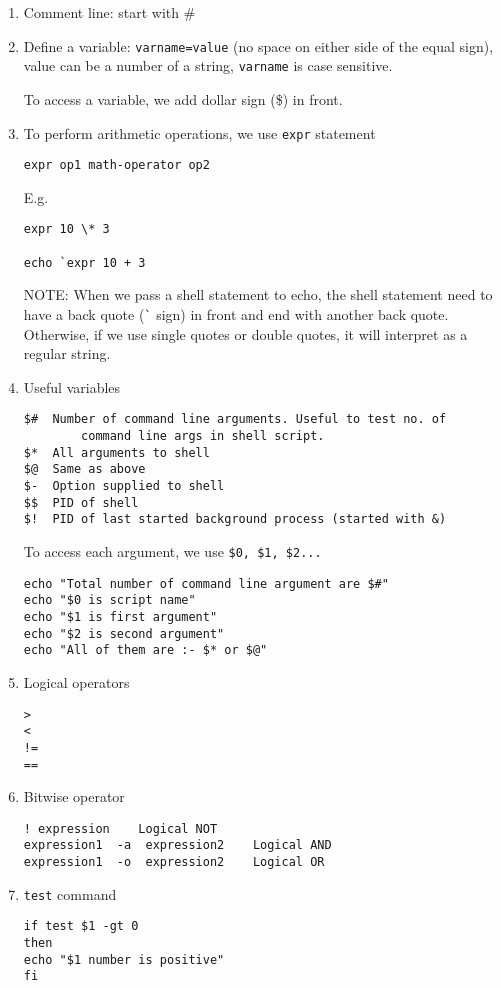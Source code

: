 \begin{enumerate}
\item Comment line: start with \#
 
\item Define a variable: \verb!varname=value! (no space on either
  side of the equal sign), value can be a number of a string,
  \verb!varname! is case sensitive.

  To access a variable, we add dollar sign (\$) in front. 

\item To perform arithmetic operations, we use \verb!expr! statement
\begin{verbatim}
expr op1 math-operator op2
\end{verbatim}
E.g.
\begin{verbatim}
expr 10 \* 3

echo `expr 10 + 3
\end{verbatim}
NOTE: When we pass a shell statement to echo, the shell statement need
to have a back quote (\verb!`! sign) in front and end with another
back quote. Otherwise, if we use single quotes or double quotes, it
will interpret as a regular string. 

\item Useful variables
\begin{verbatim}
$#	Number of command line arguments. Useful to test no. of 
        command line args in shell script.
$*	All arguments to shell
$@	Same as above
$-	Option supplied to shell
$$	PID of shell
$!	PID of last started background process (started with &)
\end{verbatim}
To access each argument, we use \verb!$0, $1, $2...!
\begin{verbatim}
echo "Total number of command line argument are $#"
echo "$0 is script name"
echo "$1 is first argument"
echo "$2 is second argument"
echo "All of them are :- $* or $@"
\end{verbatim}


\item Logical operators
\begin{verbatim}
>
<
!=
==
\end{verbatim}

\item Bitwise operator
\begin{verbatim}
! expression	Logical NOT
expression1  -a  expression2	Logical AND
expression1  -o  expression2	Logical OR
\end{verbatim}


\item \verb!test! command
\begin{verbatim}
if test $1 -gt 0
then
echo "$1 number is positive"
fi
\end{verbatim}


\end{enumerate}
